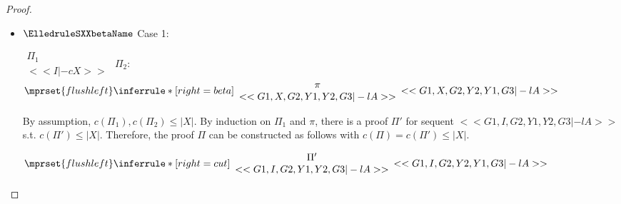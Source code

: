 \begin{proof}
\begin{enumerate}
\begin{itemize}
    \item $\ElledruleSXXbetaName$ Case 1:
      \begin{center}
        \scriptsize
        \begin{math}
          \begin{array}{c}
            \Pi_1 \\
            {<<I |-c X>>}
          \end{array}
        \end{math}
        \qquad\qquad
        $\Pi_2$:
        \begin{math}
          $$\mprset{flushleft}
          \inferrule* [right={\tiny beta}] {
            {
              \begin{array}{c}
                \pi \\
                {<<G1, X, G2, Y1, Y2, G3 |-l A>>}
              \end{array}
            }
          }{<<G1, X, G2, Y2, Y1, G3 |-l A>>}
        \end{math}
      \end{center}
      By assumption, $c(\Pi_1),c(\Pi_2)\leq |X|$. By induction on $\Pi_1$ and $\pi$, there is
      a proof $\Pi'$ for sequent $<<G1, I, G2, Y1, Y2, G3 |-l A>>$ s.t. $c(\Pi') \leq |X|$.
      Therefore, the proof $\Pi$ can be constructed as follows with
      $c(\Pi) = c(\Pi') \leq |X|$.
      \begin{center}
        \scriptsize
        \begin{math}
          $$\mprset{flushleft}
          \inferrule* [right={\tiny cut}] {
            {
              \begin{array}{cc}
                \Pi' \\
                {<<G1, I, G2, Y1, Y2, G3 |-l A>>}
              \end{array}
            }
          }{<<G1, I, G2, Y2, Y1, G3 |-l A>>}
        \end{math}
      \end{center}


\end{itemize}
\end{enumerate}
\end{proof}
